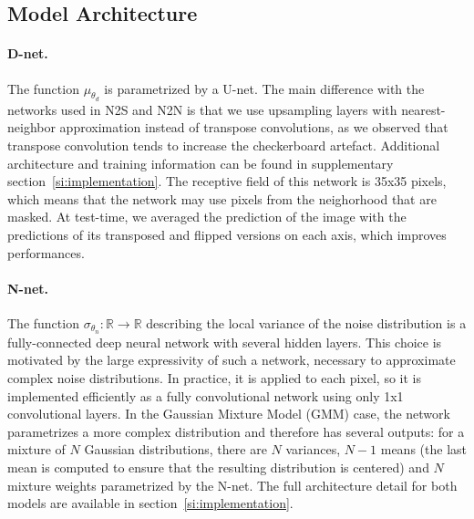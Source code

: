 \documentclass{article}
\begin{document}
\label{sec:experiments}
\subsection{Model Architecture}
\paragraph{D-net.}
The function $\mu_{\theta_d}$ is parametrized by a U-net. The main difference with the networks used in N2S and N2N is that we use upsampling layers with nearest-neighbor approximation instead of transpose convolutions, as we observed that transpose convolution tends to increase the checkerboard artefact.
Additional architecture and training information can be found in supplementary section~\ref{si:implementation}.
The receptive field of this network is 35x35 pixels, which means that the network may use pixels from the neighorhood that are masked.
At test-time, we averaged the prediction of the image with the predictions of its transposed and flipped versions on each axis, which improves performances.

\paragraph{N-net.}
The function $\sigma_{\theta_n}: \mathbb{R} \to \mathbb{R}$ describing the local variance of the noise distribution is a fully-connected deep neural network with several hidden layers. This choice is motivated by the large expressivity of such a network, necessary to approximate complex noise distributions. In practice, it is applied to each pixel, so it is implemented efficiently as a fully convolutional network using only 1x1 convolutional layers. In the Gaussian Mixture Model (GMM) case, the network parametrizes a more complex distribution and therefore has several outputs: for a mixture of $N$ Gaussian distributions, there are $N$ variances, $N-1$ means (the last mean is computed to ensure that the resulting distribution is centered) and $N$ mixture weights parametrized by the N-net. The full architecture detail for both models are available in section~\ref{si:implementation}.

\end{document}
